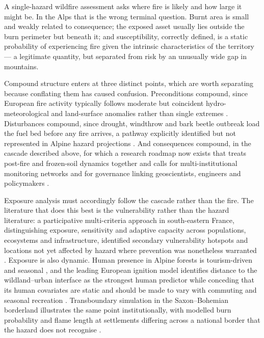 \documentclass[11pt,a4paper]{article}
\begin{document}
A single-hazard wildfire assessment asks where fire is likely and how large it might be. In the Alps that is the wrong terminal question. Burnt area is small and weakly related to consequence; the exposed asset usually lies outside the burn perimeter but beneath it; and susceptibility, correctly defined, is a static probability of experiencing fire given the intrinsic characteristics of the territory \citep{trucchia_defining_2022} --- a legitimate quantity, but separated from risk by an unusually wide gap in mountains.

Compound structure enters at three distinct points, which are worth separating because conflating them has caused confusion. Preconditions compound, since European fire activity typically follows moderate but coincident hydro-meteorological and land-surface anomalies rather than single extremes \citep{miller_compounding_2025}. Disturbances compound, since drought, windthrow and bark beetle outbreak load the fuel bed before any fire arrives, a pathway explicitly identified but not represented in Alpine hazard projections \citep{gerberding_mapping_2025, bebi_changes_2017}. And consequences compound, in the cascade described above, for which a research roadmap now exists that treats post-fire and frozen-soil dynamics together and calls for multi-institutional monitoring networks and for governance linking geoscientists, engineers and policymakers \citep{baselt_compound_2026}.

Exposure analysis must accordingly follow the cascade rather than the fire. The literature that does this best is the vulnerability rather than the hazard literature: a participative multi-criteria approach in south-eastern France, distinguishing exposure, sensitivity and adaptive capacity across populations, ecosystems and infrastructure, identified secondary vulnerability hotspots and locations not yet affected by hazard where prevention was nonetheless warranted \citep{riviere_mapping_2023}. Exposure is also dynamic. Human presence in Alpine forests is tourism-driven and seasonal \citep{pede_mountain_2022, abrham_wildfires_2024}, and the leading European ignition model identifies distance to the wildland--urban interface as the strongest human predictor while conceding that its human covariates are static and should be made to vary with commuting and seasonal recreation \citep{gelabert_assessing_2025}. Transboundary simulation in the Saxon--Bohemian borderland illustrates the same point institutionally, with modelled burn probability and flame length at settlements differing across a national border that the hazard does not recognise \citep{avouris_exposure_2025}.
\end{document}
